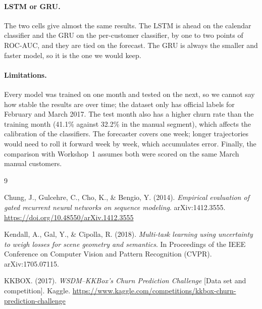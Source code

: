 \documentclass{article}
\begin{document}
\paragraph{LSTM or GRU.} The two cells give almost the same results. The LSTM is ahead on the calendar classifier and the GRU on the per-customer classifier, by one to two points of ROC-AUC, and they are tied on the forecast. The GRU is always the smaller and faster model, so it is the one we would keep.

\paragraph{Limitations.} Every model was trained on one month and tested on the next, so we cannot say how stable the results are over time; the dataset only has official labels for February and March 2017. The test month also has a higher churn rate than the training month (41.1\% against 32.2\% in the manual segment), which affects the calibration of the classifiers. The forecaster covers one week; longer trajectories would need to roll it forward week by week, which accumulates error. Finally, the comparison with Workshop~1 assumes both were scored on the same March manual customers.

\begin{thebibliography}{9}

Chung, J., Gulcehre, C., Cho, K., \& Bengio, Y. (2014).
\textit{Empirical evaluation of gated recurrent neural networks on sequence modeling}.
arXiv:1412.3555. \url{https://doi.org/10.48550/arXiv.1412.3555}

Kendall, A., Gal, Y., \& Cipolla, R. (2018).
\textit{Multi-task learning using uncertainty to weigh losses for scene geometry and semantics}.
In Proceedings of the IEEE Conference on Computer Vision and Pattern Recognition (CVPR). arXiv:1705.07115.

KKBOX. (2017).
\textit{WSDM--KKBox's Churn Prediction Challenge} [Data set and competition].
Kaggle. \url{https://www.kaggle.com/competitions/kkbox-churn-prediction-challenge}

\end{thebibliography}
\end{document}
